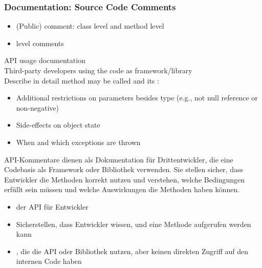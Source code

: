 \subsubsection{Documentation: Source Code Comments}
\begin{itemize}
    \item (Public)  comment: class level and method level
    \item {} level comments
\end{itemize}
\begin{defBox}[title=API comments]
     API usage documentation\\
     Third-party developers using the code as framework/library\\
    Describe in detail  method may be called and its :
    \begin{itemize}
        \item Additional restrictions on parameters besides type (e.g., not null reference or non-negative)
        \item Side-effects on object state
        \item When and which exceptions are thrown
    \end{itemize}
\end{defBox}
\begin{infoBox}[title=API-Kommentare: Eine Übersicht]
    API-Kommentare dienen als Dokumentation für Drittentwickler, die eine Codebasis als Framework oder Bibliothek verwenden. Sie stellen sicher, dass Entwickler die Methoden korrekt nutzen und verstehen, welche Bedingungen erfüllt sein müssen und welche Auswirkungen die Methoden haben können.
\end{infoBox}
\begin{infoBox}[title=Ziel(Intent):]
    \begin{itemize}
        \item {} der API für Entwickler
        \item Sicherstellen, dass Entwickler wissen,  und  eine Methode aufgerufen werden kann
    \end{itemize}
\end{infoBox}
\begin{infoBox}[title=Zielgruppe(Audience):]
    \begin{itemize}
        \item {}, die die API oder Bibliothek nutzen, aber keinen direkten Zugriff auf den internen Code haben
    \end{itemize}
\end{infoBox}
